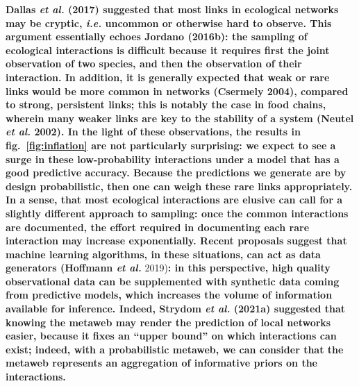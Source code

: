 \documentclass[11pt]{article}
\makeatletter
\def\maxwidth{\ifdim\Gin@nat@width>\linewidth\linewidth
\else\Gin@nat@width\fi}
\let\Oldincludegraphics\includegraphics
\renewcommand{\includegraphics}[1]{\Oldincludegraphics[width=\maxwidth]{#1}}
\providecommand{\DIFaddtex}[1]{{\bf #1}} %
\providecommand{\DIFdeltex}[1]{} %
\providecommand{\DIFaddbegin}{\protect\color{blue}} %
\providecommand{\DIFaddend}{\protect\color{black}} %
\providecommand{\DIFdelbegin}{\protect\color{red}} %
\providecommand{\DIFdelend}{\protect\color{black}} %
\providecommand{\DIFadd}[1]{\texorpdfstring{\DIFaddtex{#1}}{#1}} %
\providecommand{\DIFdel}[1]{\texorpdfstring{\DIFdeltex{#1}}{}} %
\newcommand{\DIFscaledelfig}{0.5}
\newlength{\DIFdelgraphicswidth} %
\newlength{\DIFdelgraphicsheight} %
\newcommand{\DIFaddincludegraphics}[2][]{{\color{blue}\fbox{\DIFOincludegraphics[#1]{#2}}}} %
\newcommand{\DIFdelincludegraphics}[2][]{%
\sbox{\DIFdelgraphicsbox}{\DIFOincludegraphics[#1]{#2}}%
\settoboxwidth{\DIFdelgraphicswidth}{\DIFdelgraphicsbox} %
\settoboxtotalheight{\DIFdelgraphicsheight}{\DIFdelgraphicsbox} %
\scalebox{\DIFscaledelfig}{%
\parbox[b]{\DIFdelgraphicswidth}{\usebox{\DIFdelgraphicsbox}\\[-\baselineskip] \rule{\DIFdelgraphicswidth}{0em}}\llap{\resizebox{\DIFdelgraphicswidth}{\DIFdelgraphicsheight}{%
\setlength{\unitlength}{\DIFdelgraphicswidth}%
\begin{picture}(1,1)%
\thicklines\linethickness{2pt} %
{\color[rgb]{1,0,0}\put(0,0){\framebox(1,1){}}}%
{\color[rgb]{1,0,0}\put(0,0){\line( 1,1){1}}}%
{\color[rgb]{1,0,0}\put(0,1){\line(1,-1){1}}}%
\end{picture}%
}\hspace*{3pt}}} %
} %
\DeclareRobustCommand{\DIFaddbegin}{\DIFOaddbegin \let\includegraphics\DIFaddincludegraphics} %
\DeclareRobustCommand{\DIFaddend}{\DIFOaddend \let\includegraphics\DIFOincludegraphics} %
\DeclareRobustCommand{\DIFdelbegin}{\DIFOdelbegin \let\includegraphics\DIFdelincludegraphics} %
\DeclareRobustCommand{\DIFdelend}{\DIFOaddend \let\includegraphics\DIFOincludegraphics} %
\makeatother
\begin{document}
\DIFdelbegin \DIFdel{Cirtwill \emph{et al.} (}\DIFdelend \DIFaddbegin \DIFadd{Dallas \emph{et al.} (2017) suggested that most links in ecological
networks may be cryptic, \emph{i.e.} uncommon or otherwise hard to
observe. This argument essentially echoes Jordano (2016b): the sampling
of ecological interactions is difficult because it requires first the
joint observation of two species, and then the observation of their
interaction. In addition, it is generally expected that weak or rare
links would be more common in networks (Csermely 2004), compared to
strong, persistent links; this is notably the case in food chains,
wherein many weaker links are key to the stability of a system (Neutel
\emph{et al.} 2002). In the light of these observations, the results in
fig.~\ref{fig:inflation} are not particularly surprising: we expect to
see a surge in these low-probability interactions under a model that has
a good predictive accuracy. Because the predictions we generate are by
design probabilistic, then one can weigh these rare links appropriately.
In a sense, that most ecological interactions are elusive can call for a
slightly different approach to sampling: once the common interactions
are documented, the effort required in documenting each rare interaction
may increase exponentially. Recent proposals suggest that machine
learning algorithms, in these situations, can act as data generators
(Hoffmann \emph{et al.} }\DIFaddend 2019)\DIFdelbegin \DIFdel{previously made the point }\DIFdelend \DIFaddbegin \DIFadd{: in this perspective, high quality
observational data can be supplemented with synthetic data coming from
predictive models, which increases the volume of information available
for inference. Indeed, Strydom \emph{et al.} (2021a) suggested that
knowing the metaweb may render the prediction of local networks easier,
because it fixes an ``upper bound'' on which interactions can exist;
indeed, with a probabilistic metaweb, we can consider that the metaweb
represents an aggregation of informative priors on the interactions.
}
\end{document}
